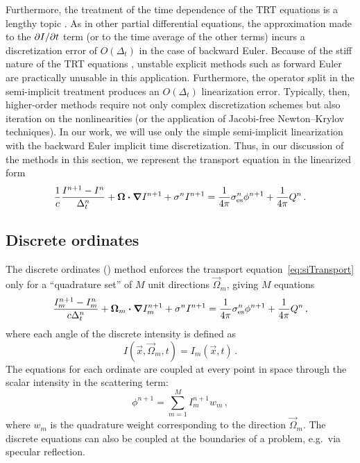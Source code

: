 Furthermore, the treatment of the time dependence of the TRT equations is a lengthy
topic \cite{Low2004}. As in other partial differential equations, the
approximation made to the
${\partial I}/{\partial t}$ term (or to the time average of the other terms) incurs a
discretization error of $O(\Delta_t)$ in the case of backward Euler.
Because of the stiff nature of the TRT equations \cite{Kno2003}, unstable explicit
methods such as forward Euler are practically unusable in this application.
Furthermore, the operator split in the semi-implicit treatment produces an
$O(\Delta_t)$ linearization error. Typically, then,
higher-order methods require not only complex discretization schemes but also
iteration on the nonlinearities (or the
application of Jacobi-free Newton--Krylov techniques). In our work, we will use
only the simple semi-implicit linearization with the backward Euler implicit time
discretization. Thus, in our discussion of the methods in this section, we
represent
the transport equation in the linearized form
\begin{equation}\label{eq:siTransport}
  \frac{1}{c} \frac{I^{n+1} - I^n}{\Delta_t^n}
  + \bm{\Omega} \bm{\cdot} \bm{\nabla} I^{n+1}
  + \sigma^n I^{n+1}
  = \frac{1}{4\pi} \sigma_\mathrm{es}^n \phi^{n+1}
  + \frac{1}{4\pi} Q^n\,.
\end{equation}

\subsection{Discrete ordinates}

The discrete ordinates (\SN) method enforces the transport
equation~\eqref{eq:siTransport} only for a ``quadrature set'' of $M$ unit
directions $\vec{\Omega}_m$, giving $M$ equations
\begin{equation}\label{eq:snTransport}
  \frac{I_{m}^{n+1} - I_{m}^n}{c \Delta_t^n}
  + \bm{\Omega}_{m} \bm{\cdot} \bm{\nabla} I_{m}^{n+1}
  + \sigma^n I^{n+1}
  = \frac{1}{4\pi} \sigma_\mathrm{es}^n \phi^{n+1}
  + \frac{1}{4\pi} Q^n\,,
\end{equation}
where each angle of the discrete intensity is defined as
\begin{equation*}
  I(\vec{x},\vec{\Omega}_m,t) = I_m(\vec{x},t)\,.
\end{equation*}
The equations for each ordinate are coupled at every point in space through the
scalar intensity in the scattering term:
\begin{equation*}
  \phi^{n+1} = \sum_{m=1}^M I_m^{n+1} w_m \,,
\end{equation*}
where $w_m$ is the quadrature weight corresponding to the direction
$\vec{\Omega}_m$.  The discrete equations can also be coupled at the boundaries
of a problem, e.g.~via specular reflection.

